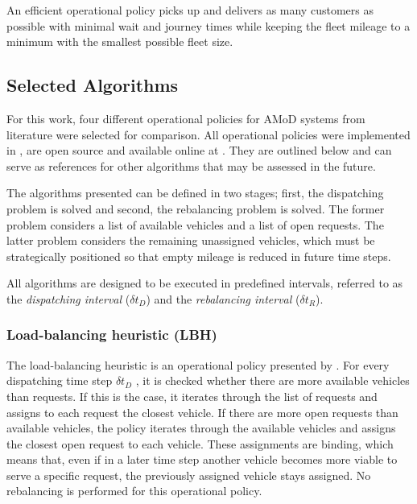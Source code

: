 

An efficient operational policy picks up and delivers as many customers as possible with minimal wait and journey times while keeping the fleet mileage to a minimum with the smallest possible fleet size.


\subsection{Selected Algorithms}


For this work, four different operational policies for AMoD systems from literature were selected for comparison. All  operational policies were implemented in \citep{amodeusBase}, are open source and available online at \citep{AMoDeus-API}. They are outlined below and can serve as references for other algorithms that may be assessed in the future.


The algorithms presented can be defined in two stages; first, the dispatching problem is solved and second, the rebalancing problem is solved. The former problem considers a list of available vehicles and a list of open requests. The latter problem considers the remaining unassigned vehicles, which must be strategically positioned so that empty mileage is reduced in future time steps.


All algorithms are designed to be executed in predefined intervals, referred to as the \textit{dispatching interval} ($\delta t_D$) and the \textit{rebalancing interval} ($\delta t_R$).

\subsubsection{Load-balancing heuristic (LBH)}

The load-balancing heuristic is an operational policy presented by \citet{bischoff2016simulation}. For every dispatching time step $\delta t_D$ , it is checked whether there are more available vehicles than requests. If this is the case, it iterates through the list of requests and assigns to each request the closest vehicle. If there are more open requests than available vehicles, the policy iterates through the available vehicles and assigns the closest open request to each vehicle. These assignments are binding, which means that, even if in a later time step another vehicle becomes more viable to serve a specific request, the previously assigned vehicle stays assigned. No rebalancing is performed for this operational policy.


